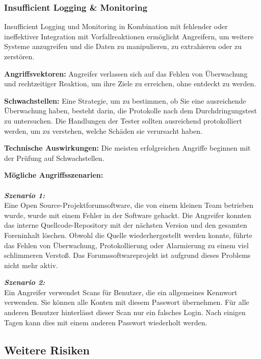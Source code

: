 \subsubsection{Insufficient Logging \& Monitoring}

Insufficient Logging und Monitoring in Kombination mit fehlender oder ineffektiver Integration mit Vorfallreaktionen ermöglicht Angreifern, um weitere Systeme anzugreifen und die Daten zu manipulieren, zu extrahieren oder zu zerstören\cite[6]{owasp17top10}.

\textbf{Angriffsvektoren:} Angreifer verlassen sich auf das Fehlen von Überwachung und rechtzeitiger Reaktion, um ihre Ziele zu erreichen, ohne entdeckt zu werden\cite[16]{owasp17top10}.

\textbf{Schwachstellen:} Eine Strategie, um zu bestimmen, ob Sie eine ausreichende Überwachung haben, besteht darin, die Protokolle nach dem Durchdringungstest zu untersuchen. Die Handlungen der Tester sollten ausreichend protokolliert werden, um zu verstehen, welche Schäden sie verursacht haben\cite[16]{owasp17top10}.

\textbf{Technische Auswirkungen:} Die meisten erfolgreichen Angriffe beginnen mit der Prüfung auf Schwachstellen\cite[16]{owasp17top10}.

\textbf{Mögliche Angriffsszenarien:}\\
\\
\textbf{\textit{Szenario 1:}}\\
Eine Open Source-Projektforumsoftware, die von einem kleinen Team betrieben wurde, wurde mit einem Fehler in der Software gehackt. Die Angreifer konnten das interne Quellcode-Repository mit der nächsten Version und den gesamten Foreninhalt löschen. Obwohl die Quelle wiederhergestellt werden konnte, führte das Fehlen von Überwachung, Protokollierung oder Alarmierung zu einem viel schlimmeren Verstoß. Das Forumssoftwareprojekt ist aufgrund dieses Problems nicht mehr aktiv\cite[16]{owasp17top10}.

\textbf{\textit{Szenario 2:}}\\
Ein Angreifer verwendet Scans für Benutzer, die ein allgemeines Kennwort verwenden. Sie können alle Konten mit diesem Passwort übernehmen. Für alle anderen Benutzer hinterlässt dieser Scan nur ein falsches Login. Nach einigen Tagen kann dies mit einem anderen Passwort wiederholt werden\cite[16]{owasp17top10}.

\subsection{Weitere Risiken}

